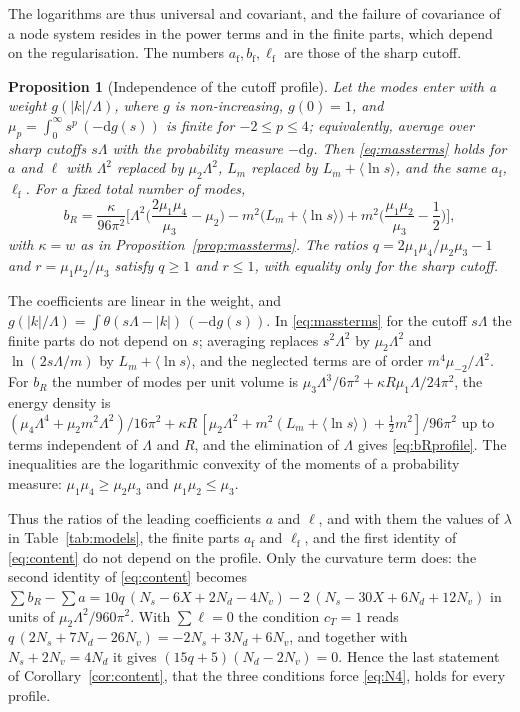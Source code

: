 \documentclass[11pt,a4paper]{article}
\makeatletter
\theoremstyle{stmt}
\newtheorem{proposition}[theorem]{Proposition}
\theoremstyle{defn}
\theoremstyle{rmk}
\renewenvironment{proof}[1][\proofname]{\par\pushQED{\qed}\normalfont\topsep6\p@\@plus6\p@\relax
  \trivlist\item[\hskip\labelsep{\sffamily\itshape\small #1.}]\ignorespaces}{\popQED\endtrivlist\@endpefalse}
\numberwithin{equation}{section}
\newcommand{\dd}{\mathrm{d}}
\makeatother
\begin{document}
The logarithms are thus universal and covariant, and the failure of covariance of a node system resides in the power terms and in the finite parts, which depend on the regularisation. The numbers $a_{\mathrm f},b_{\mathrm f},\ell_{\mathrm f}$ are those of the sharp cutoff.

\begin{proposition}[Independence of the cutoff profile]\label{prop:profile}
Let the modes enter with a weight $g(|k|/\Lambda)$, where $g$ is non-increasing, $g(0)=1$, and $\mu_p=\int_0^\infty s^p\,(-\dd g(s))$ is finite for $-2\le p\le4$; equivalently, average over sharp cutoffs $s\Lambda$ with the probability measure $-\dd g$. Then \eqref{eq:massterms} holds for $a$ and $\ell$ with $\Lambda^2$ replaced by $\mu_2\Lambda^2$, $L_m$ replaced by $L_m+\langle\ln s\rangle$, and the \emph{same} $a_{\mathrm f}$, $\ell_{\mathrm f}$. For a fixed total number of modes,
\begin{equation}\label{eq:bRprofile}
b_R=\frac{\kappa}{96\pi^2}\Big[\Lambda^2\Big(\frac{2\mu_1\mu_4}{\mu_3}-\mu_2\Big)-m^2\big(L_m+\langle\ln s\rangle\big)+m^2\Big(\frac{\mu_1\mu_2}{\mu_3}-\frac12\Big)\Big],
\end{equation}
with $\kappa=w$ as in Proposition~\ref{prop:massterms}. The ratios $q=2\mu_1\mu_4/\mu_2\mu_3-1$ and $r=\mu_1\mu_2/\mu_3$ satisfy $q\ge1$ and $r\le1$, with equality only for the sharp cutoff.
\end{proposition}

\begin{proof}
The coefficients are linear in the weight, and $g(|k|/\Lambda)=\int\theta(s\Lambda-|k|)\,(-\dd g(s))$. In \eqref{eq:massterms} for the cutoff $s\Lambda$ the finite parts do not depend on $s$; averaging replaces $s^2\Lambda^2$ by $\mu_2\Lambda^2$ and $\ln(2s\Lambda/m)$ by $L_m+\langle\ln s\rangle$, and the neglected terms are of order $m^4\mu_{-2}/\Lambda^2$. For $b_R$ the number of modes per unit volume is $\mu_3\Lambda^3/6\pi^2+\kappa R\mu_1\Lambda/24\pi^2$, the energy density is $(\mu_4\Lambda^4+\mu_2m^2\Lambda^2)/16\pi^2+\kappa R\,[\mu_2\Lambda^2+m^2(L_m+\langle\ln s\rangle)+\tfrac12m^2]/96\pi^2$ up to terms independent of $\Lambda$ and $R$, and the elimination of $\Lambda$ gives \eqref{eq:bRprofile}. The inequalities are the logarithmic convexity of the moments of a probability measure: $\mu_1\mu_4\ge\mu_2\mu_3$ and $\mu_1\mu_2\le\mu_3$.
\end{proof}

Thus the ratios of the leading coefficients $a$ and $\ell$, and with them the values of $\lambda$ in Table~\ref{tab:models}, the finite parts $a_{\mathrm f}$ and $\ell_{\mathrm f}$, and the first identity of \eqref{eq:content} do not depend on the profile. Only the curvature term does: the second identity of \eqref{eq:content} becomes $\sum b_R-\sum a=10q\,(N_s-6X+2N_d-4N_v)-2\,(N_s-30X+6N_d+12N_v)$ in units of $\mu_2\Lambda^2/960\pi^2$. With $\sum\ell=0$ the condition $c_T=1$ reads $q\,(2N_s+7N_d-26N_v)=-2N_s+3N_d+6N_v$, and together with $N_s+2N_v=4N_d$ it gives $(15q+5)(N_d-2N_v)=0$. Hence the last statement of Corollary~\ref{cor:content}, that the three conditions force \eqref{eq:N4}, holds for every profile.
\end{document}
